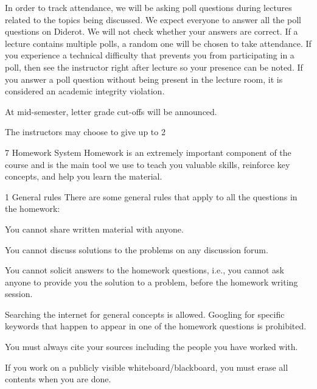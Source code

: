 In order to track attendance, we will be asking poll questions during lectures related to the topics being discussed. We expect everyone to answer all the poll questions on Diderot. We will not check whether your answers are correct. If a lecture contains multiple polls, a random one will be chosen to take attendance. If you experience a technical difficulty that prevents you from participating in a poll, then see the instructor right after lecture so your presence can be noted. If you answer a poll question without being present in the lecture room, it is considered an academic integrity violation.

At mid-semester, letter grade cut-offs will be announced.

The instructors may choose to give up to 2%

 
7  Homework System
Homework is an extremely important component of the course and is the main tool we use to teach you valuable skills, reinforce key concepts, and help you learn the material.

 1
General rules
There are some general rules that apply to all the questions in the homework:

You cannot share written material with anyone.

You cannot discuss solutions to the problems on any discussion forum.

You cannot solicit answers to the homework questions, i.e., you cannot ask anyone to provide you the solution to a problem, before the homework writing session.

Searching the internet for general concepts is allowed. Googling for specific keywords that happen to appear in one of the homework questions is prohibited.

You must always cite your sources including the people you have worked with.

If you work on a publicly visible whiteboard/blackboard, you must erase all contents when you are done.

